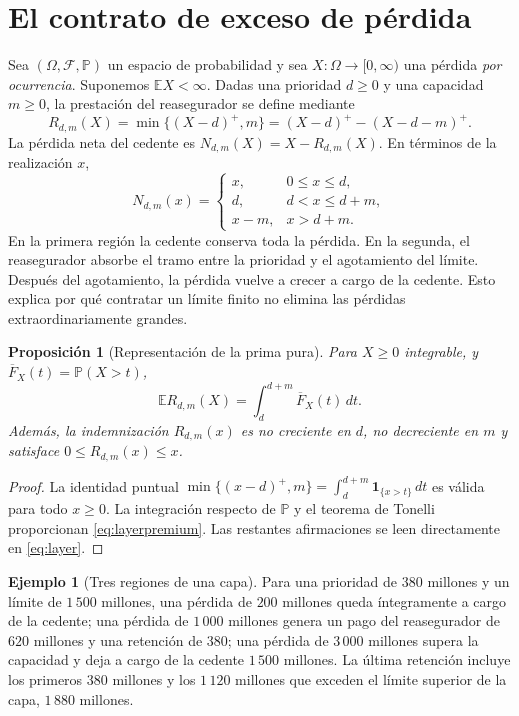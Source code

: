 \documentclass[11pt,reqno]{amsart}
\newtheorem{proposition}[theorem]{Proposición}
\theoremstyle{definition}\newtheorem{definition}[theorem]{Definición}
\newtheorem{example}[theorem]{Ejemplo}
\theoremstyle{remark}\newtheorem{remark}[theorem]{Observación}
\newcommand{\E}{\mathbb E}
\newcommand{\Prob}{\mathbb P}
\newcommand{\pos}[1]{(#1)^+}
\begin{document}
\section{El contrato de exceso de pérdida}
Sea $(\Omega,\mathscr F,\Prob)$ un espacio de probabilidad y sea $X:\Omega\to[0,\infty)$ una pérdida \emph{por ocurrencia}. Suponemos $\E X<\infty$. Dadas una prioridad $d\ge0$ y una capacidad $m\ge0$, la prestación del reasegurador se define mediante
\begin{equation}\label{eq:layer}
R_{d,m}(X)=\min\{\pos{X-d},m\}=\pos{X-d}-\pos{X-d-m}.
\end{equation}
La pérdida neta del cedente es $N_{d,m}(X)=X-R_{d,m}(X)$. En términos de la realización $x$,
\begin{equation}\label{eq:netpiece}
N_{d,m}(x)=\begin{cases}
x,&0\le x\le d,\\
d,&d<x\le d+m,\\
x-m,&x>d+m.
\end{cases}
\end{equation}
En la primera región la cedente conserva toda la pérdida. En la segunda, el reasegurador absorbe el tramo entre la prioridad y el agotamiento del límite. Después del agotamiento, la pérdida vuelve a crecer a cargo de la cedente. Esto explica por qué contratar un límite finito no elimina las pérdidas extraordinariamente grandes.

\begin{proposition}[Representación de la prima pura]\label{prop:layer}
Para $X\ge0$ integrable, y $\overline F_X(t)=\Prob(X>t)$,
\begin{equation}\label{eq:layerpremium}
\E R_{d,m}(X)=\int_d^{d+m}\overline F_X(t)\,dt.
\end{equation}
Además, la indemnización $R_{d,m}(x)$ es no creciente en $d$, no decreciente en $m$ y satisface $0\le R_{d,m}(x)\le x$.
\end{proposition}
\begin{proof}
La identidad puntual
$\min\{\pos{x-d},m\}=\int_d^{d+m}\mathbf1_{\{x>t\}}\,dt$
es válida para todo $x\ge0$. La integración respecto de $\Prob$ y el teorema de Tonelli proporcionan \eqref{eq:layerpremium}. Las restantes afirmaciones se leen directamente en \eqref{eq:layer}.
\end{proof}

\begin{example}[Tres regiones de una capa]
Para una prioridad de $380$ millones y un límite de $1\,500$ millones, una pérdida de $200$ millones queda íntegramente a cargo de la cedente; una pérdida de $1\,000$ millones genera un pago del reasegurador de $620$ millones y una retención de $380$; una pérdida de $3\,000$ millones supera la capacidad y deja a cargo de la cedente $1\,500$ millones. La última retención incluye los primeros $380$ millones y los $1\,120$ millones que exceden el límite superior de la capa, $1\,880$ millones.
\end{example}
\end{document}
